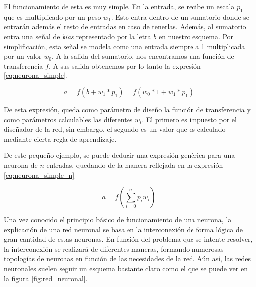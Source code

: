 El funcionamiento de esta es muy simple. En la entrada, se recibe un escala $p_1$ que es multiplicado por un peso $w_1$. Esto entra dentro de un sumatorio donde se entrarán además el resto de entradas en caso de tenerlas. Además, al sumatorio entra una señal de \textit{bias} representado por la letra $b$ en nuestro esquema. Por simplificación, esta señal se modela como una entrada siempre a 1 multiplicada por un valor $w_0$. A la salida del sumatorio, nos encontramos una función de transferencia $f$. A sus salida obtenemos por lo tanto la expresión \ref{eq:neurona_simple}.

\begin{equation}
    a = f(b + w_1 * p_1) = f(w_0 * 1 + w_1 * p_1)
    \label{eq:neurona_simple}
\end{equation}

De esta expresión, queda como parámetro de diseño la función de transferencia y como parámetros calculables las diferentes $w_i$. El primero es impuesto por el diseñador de la red, sin embargo, el segundo es un valor que es calculado mediante cierta regla de aprendizaje.

De este pequeño ejemplo, se puede deducir una expresión genérica para una neurona de $n$ entradas, quedando de la manera reflejada en la expresión \ref{eq:neurona_simple_n}

\begin{equation}
    a = f(\sum^{n}_{i=0} p_i w_i)
    \label{eq:neurona_simple_n}
\end{equation}

Una vez conocido el principio básico de funcionamiento de una neurona, la explicación de una red neuronal se basa en la interconexión de forma lógica de gran cantidad de estas neuronas. En función del problema que se intente resolver, la interconexión se realizará de diferentes maneras, formando numerosas topologías de neuronas en función de las necesidades de la red. Aún así, las redes neuronales suelen seguir un esquema bastante claro como el que se puede ver en la figura \ref{fig:red_neuronal}.

